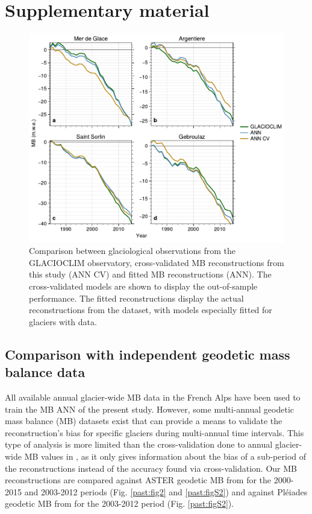 \section{Supplementary material}

\begin{figure}[h]
\centering
\includegraphics[width=12cm]{Figures/past/Figure_S1.pdf}
\captionsetup{justification=centering}
\caption{Comparison between glaciological observations from the GLACIOCLIM observatory, cross-validated MB reconstructions from this study (ANN CV) and fitted MB reconstructions (ANN). The cross-validated models are shown to display the out-of-sample performance. The fitted reconstructions display the actual reconstructions from the dataset, with models especially fitted for glaciers with data.}
\label{past:figS1}
\end{figure}


\subsection{Comparison with independent geodetic mass balance data} \label{past:supp:comparison}

All available annual glacier-wide MB data in the French Alps have been used to train the MB ANN of the present study. However, some multi-annual geodetic mass balance (MB) datasets exist that can provide a means to validate the reconstruction's bias for specific glaciers during multi-annual time intervals. This type of analysis is more limited than the cross-validation done to annual glacier-wide MB values in \cite{bolibar_deep_2020-1}, as it only gives information about the bias of a sub-period of the reconstructions instead of the accuracy found via cross-validation. Our MB reconstructions are compared against ASTER geodetic MB from \citet{davaze_region-wide_2020} for the 2000-2015 and 2003-2012 periods (Fig. \ref{past:fig2} and \ref{past:figS2}) and against Pléiades geodetic MB from \citet{berthier_glacier_2014} for the 2003-2012 period (Fig. \ref{past:figS2}).

